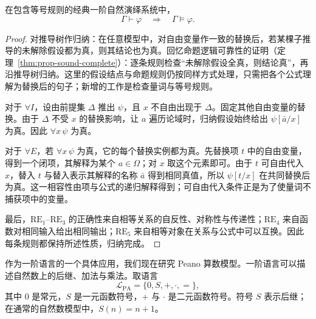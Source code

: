 \documentclass[lang=cn,a4paper,fontset=none,zihao=false,10pt,openany,twoside]{beautybook}
\numberwithin{algorithm}{chapter}
\begin{document}
\begin{theorem}[一阶逻辑的可靠性]\label{thm:fo-sound}
在包含等号规则的经典一阶自然演绎系统中，
\[
 \Gamma\vdash\varphi\quad\Longrightarrow\quad\Gamma\models\varphi.
\]
\end{theorem}
\begin{proof}
对推导树作归纳：在任意模型中，对自由变量作一致的替换后，若某棵子推导的未解除假设都为真，则其结论也为真。回忆命题逻辑可靠性的证明（定理~\ref{thm:prop-sound-complete}）：逐条规则检查“未解除假设全真，则结论真”，再沿推导树归纳。这里的假设结点与命题规则仍按同样方式处理，只需把各个公式理解为替换后的句子；新增的工作是检查量词与等号规则。

对于 $\forall I$，设由前提集 $\Delta$ 推出 $\psi$，且 $x$ 不自由出现于 $\Delta$。固定其他自由变量的替换。由于 $\Delta$ 不受 $x$ 的替换影响，让 $a$ 遍历论域时，归纳假设始终给出 $\psi[\bar a/x]$ 为真。因此 $\forall x\,\psi$ 为真。

对于 $\forall E$，若 $\forall x\,\psi$ 为真，它的每个替换实例都为真。先替换项 $t$ 中的自由变量，得到一个闭项，其解释为某个 $a\in\Omega$；对 $x$ 取这个元素即可。由于 $t$ 可自由代入 $x$，替入 $t$ 与替入表示其解释的名称 $\bar a$ 得到相同真值，所以 $\psi[t/x]$ 在共同替换后为真。这一相容性由项与公式的递归解释得到；可自由代入条件正是为了使量词不捕获项中的变量。

最后，$\mathrm{RE}_1$--$\mathrm{RE}_3$ 的正确性来自相等关系的自反性、对称性与传递性；$\mathrm{RE}_4$ 来自函数对相同输入给出相同输出；$\mathrm{RE}_5$ 来自相等对象在关系与公式中可以互换。因此每条规则都保持所述性质，归纳完成。
\end{proof}

作为一阶语言的一个具体应用，我们现在研究 Peano 算数模型。一阶语言可以描述自然数上的后继、加法与乘法。取语言
\[
 \mathcal L_{\mathrm{PA}}=\{0,S,+,\cdot,=\},
\]
其中 $0$ 是常元，$S$ 是一元函数符号，$+$ 与 $\cdot$ 是二元函数符号。符号 $S$ 表示后继；在通常的自然数模型中，$S(n)=n+1$。
\end{document}
